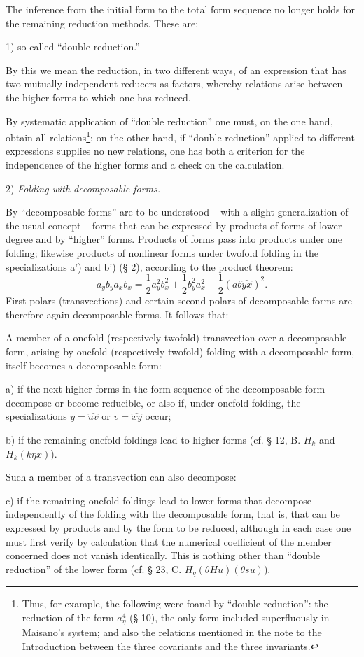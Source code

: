 \documentclass[11pt]{article}
\begin{document}
The inference from the initial form to the total form sequence no longer holds for the remaining reduction methods. These are:

1) so-called ``double reduction.''

By this we mean the reduction, in two different ways, of an expression that has two mutually independent reducers as factors, whereby relations arise between the higher forms to which one has reduced.

By systematic application of ``double reduction'' one must, on the one hand, obtain all relations\footnote{Thus, for example, the following were foand by ``double reduction'': the reduction of the form $a_\eta^4$ (§ 10), the only form included superfluously in Maisano's system; and also the relations mentioned in the note to the Introduction between the three covariants and the three invariants.}; on the other hand, if ``double reduction'' applied to different expressions supplies no new relations, one has both a criterion for the independence of the higher forms and a check on the calculation.

2) \emph{Folding with decomposable forms.}

By ``decomposable forms'' are to be understood -- with a slight generalization of the usual concept -- forms that can be expressed by products of forms of lower degree and by ``higher'' forms. Products of forms pass into products under one folding; likewise products of nonlinear forms under twofold folding in the specializations a') and b') (§ 2), according to the product theorem:
\[
a_yb_y a_xb_x=\frac12a_y^2b_x^2+\frac12b_y^2a_x^2-\frac12(ab\widehat{yx})^2.
\]
First polars (transvections) and certain second polars of decomposable forms are therefore again decomposable forms. It follows that:

A member of a onefold (respectively twofold) transvection over a decomposable form, arising by onefold (respectively twofold) folding with a decomposable form, itself becomes a decomposable form:

a) if the next-higher forms in the form sequence of the decomposable form decompose or become reducible, or also if, under onefold folding, the specializations $y=\widehat{uv}$ or $v=\widehat{xy}$ occur;

b) if the remaining onefold foldings lead to higher forms (cf. § 12, B. $H_k$ and $H_k(k\eta x)$).

Such a member of a transvection can also decompose:

c) if the remaining onefold foldings lead to lower forms that decompose independently of the folding with the decomposable form, that is, that can be expressed by products and by the form to be reduced, although in each case one must first verify by calculation that the numerical coefficient of the member concerned does not vanish identically. This is nothing other than ``double reduction'' of the lower form (cf. § 23, C. $H_q(\theta H u)(\theta s u)$).
\end{document}
